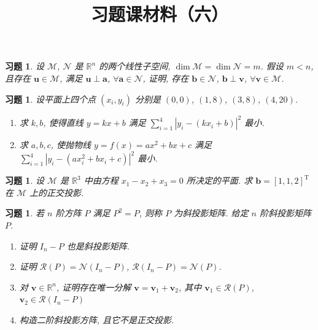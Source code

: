 \documentclass[UTF8]{ctexart}
\newtheorem{ex}[thm]{习题}
\begin{document}
\title{习题课材料（六）}
\date{}

\maketitle


\begin{ex}
  设 \(\mathcal{M}\), \(\mathcal{N}\) 是 \(\mathbb{R}^{n}\) 的两个线性子空间,
  \(\dim \mathcal{M} = \dim \mathcal{N} = m\). 假设 \(m < n\), 且存在
  \(\boldsymbol{u} \in \mathcal{M}\), 满足 \(\boldsymbol{u} \perp \boldsymbol{a}\), \(\forall\boldsymbol{a} \in \mathcal{N}\),
  证明, 存在 \(\boldsymbol{b} \in \mathcal{N}\), \(\boldsymbol{b} \perp \boldsymbol{v}\), \(\forall \boldsymbol{v} \in \mathcal{M}\).
\end{ex}


\begin{ex}
  设平面上四个点 \((x_i,y_i)\) 分别是
  \((0,0)\), \((1,8)\), \((3,8)\), \((4,20)\).
  \begin{enumerate}
  \item 求 \(k, b\), 使得直线 \(y = kx + b\) 满足
    \(\sum_{i=1}^{4}|y_i - (kx_i+b)|^2\) 最小.
  \item 求 \(a,b,c\), 使抛物线 \(y = f(x) = ax^2 + bx + c\) 满足
    \(\sum_{i=1}^{4}|y_i - (ax_i^2+bx_i + c)|^2\) 最小.
  \end{enumerate}
\end{ex}



\begin{ex}
  设 \(\mathcal{M}\) 是 \(\mathbb{R}^{3}\) 中由方程
  \(x_1-x_2+x_3=0\) 所决定的平面. 求 \(\boldsymbol{b} = [1,1,2]^{\mathrm{T}}\)
  在 \(\mathcal{M}\) 上的正交投影.
\end{ex}



\begin{ex}
  若 \(n\) 阶方阵 \(P\) 满足 \(P^{2} = P\), 则称 \(P\) 为斜投影矩阵.
  给定 \(n\) 阶斜投影矩阵 \(P\).
  \begin{enumerate}
  \item 证明 \(I_{n} - P\) 也是斜投影矩阵.
  \item 证明 \(\mathcal{R}(P) = \mathcal{N}(I_{n} - P)\), \(\mathcal{R}(I_{n}-P) = \mathcal{N}(P)\).
  \item 对 \(\boldsymbol{v} \in \mathbb{R}^{n}\), 证明存在唯一分解 \(\boldsymbol{v} = \boldsymbol{v}_1 + \boldsymbol{v}_{2}\),
    其中 \(\boldsymbol{v}_{1} \in \mathcal{R}(P)\), \(\boldsymbol{v}_{2} \in \mathcal{R}(I_{n} - P)\)
  \item 构造二阶斜投影方阵, 且它不是正交投影.
  \end{enumerate}
\end{ex}
\end{document}
